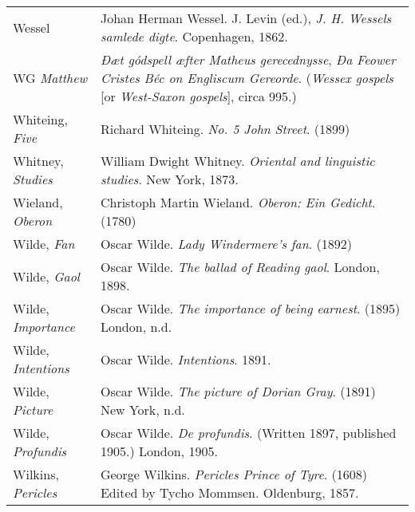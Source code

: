 \begin{longtable}{p{} p{}}
Wessel & Johan Herman Wessel. J. Levin (ed.), \textit{J. H. Wessels samlede digte}. Copenhagen, 1862.\\

WG \textit{Matthew} & \textit{Đæt gódspell æfter Matheus gerecednysse}, \textit{Đa Feower Cristes Béc on Engliscum Gereorde}. (\textit{Wessex gospels} {[}or \textit{West-Saxon gospels}{]}, circa 995.) \\ %
%

Whiteing, \textit{Five} & Richard Whiteing. \textit{No. 5 John Street}. (1899) \\

Whitney, \textit{Studies} & William Dwight Whitney. \textit{Oriental and linguistic studies}. New York, 1873. \\ %

Wieland, \textit{Oberon} & Christoph Martin Wieland. \textit{Oberon: Ein Gedicht}. (1780) \\

Wilde, \textit{Fan} & Oscar Wilde. \textit{Lady Windermere’s fan}. (1892) \\
Wilde, \textit{Gaol} & Oscar Wilde. \textit{The ballad of Reading gaol}. London, 1898. \\
Wilde, \textit{Importance} & Oscar Wilde. \textit{The importance of being earnest}. (1895) London, n.d. \\
Wilde, \textit{Intentions} & Oscar Wilde. \textit{Intentions}. 1891. \\
Wilde, \textit{Picture} & Oscar Wilde. \textit{The picture of Dorian Gray}. (1891) New York, n.d. \\
Wilde, \textit{Profundis} & Oscar Wilde. \textit{De profundis}. (Written 1897, published 1905.) London, 1905. \\

Wilkins, \textit{Pericles} & George Wilkins. \textit{Pericles Prince of Tyre}. (1608) Edited by Tycho Mommsen. Oldenburg, 1857. \\
%


\end{longtable}
